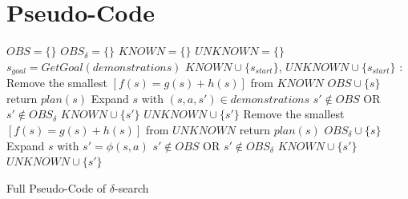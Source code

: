 



\newpage
\section{Pseudo-Code}

\begin{algorithm}
	\begin{algorithmic}[1]
		 {}
		\State $OBS = \{\}$
		\State $OBS_{\delta} = \{\}$
		\State $KNOWN = \{\}$
		\State $UNKNOWN = \{\}$
		\State $s_{goal} = GetGoal(demonstrations)$
		\State $KNOWN \cup \{s_{start}\}$, $UNKNOWN \cup \{s_{start}\}$
		:
		\State Remove the smallest $[f(s) = g(s) + h(s)]$ from $KNOWN$
		\State $OBS \cup \{s\}$
			return $plan(s)$ 
		\EndIf
		\State Expand $s$ with $(s,a,s') \in demonstrations$ \hfill $s' \not \in OBS$ OR $s' \not \in OBS_{\delta}$
		\State $KNOWN \cup \{s'\}$
		\EndIf
		\State $UNKNOWN \cup \{s'\}$
		\State Remove the smallest $[f(s) = g(s) + h(s)]$ from $UNKNOWN$
			return $plan(s)$
		\EndIf
		\State $OBS_{\delta} \cup \{s\}$
		\State Expand $s$ with $s' = \phi(s,a)$ \hspace{2cm}  $s' \not \in OBS$ OR $s' \not \in OBS_{\delta}$
		\State $KNOWN \cup \{s'\}$
		\EndIf
		\State $UNKNOWN \cup \{s'\}$	
		\EndIf
		\EndWhile
		\EndFunction
	\end{algorithmic}
	\caption{Full Pseudo-Code of $\delta$-search}
\end{algorithm}

